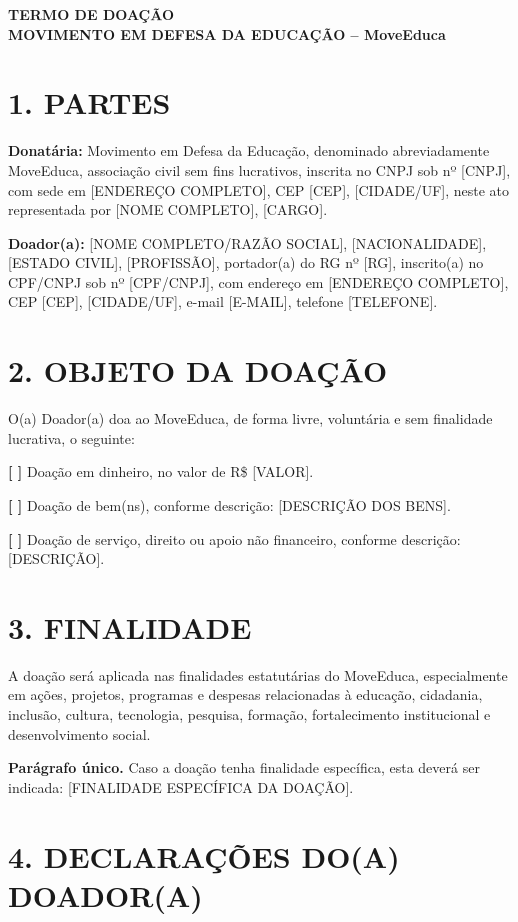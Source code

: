 \documentclass[11pt,a4paper]{article}
\begin{document}
\begin{center}
\textbf{\Large TERMO DE DOAÇÃO}\\
\textbf{\large MOVIMENTO EM DEFESA DA EDUCAÇÃO -- MoveEduca}
\end{center}

\section*{1. PARTES}

\textbf{Donatária:} Movimento em Defesa da Educação, denominado abreviadamente MoveEduca, associação civil sem fins lucrativos, inscrita no CNPJ sob nº [CNPJ], com sede em [ENDEREÇO COMPLETO], CEP [CEP], [CIDADE/UF], neste ato representada por [NOME COMPLETO], [CARGO].

\textbf{Doador(a):} [NOME COMPLETO/RAZÃO SOCIAL], [NACIONALIDADE], [ESTADO CIVIL], [PROFISSÃO], portador(a) do RG nº [RG], inscrito(a) no CPF/CNPJ sob nº [CPF/CNPJ], com endereço em [ENDEREÇO COMPLETO], CEP [CEP], [CIDADE/UF], e-mail [E-MAIL], telefone [TELEFONE].

\section*{2. OBJETO DA DOAÇÃO}

O(a) Doador(a) doa ao MoveEduca, de forma livre, voluntária e sem finalidade lucrativa, o seguinte:

\textbf{[ \quad ]} Doação em dinheiro, no valor de R\$ [VALOR].

\textbf{[ \quad ]} Doação de bem(ns), conforme descrição: [DESCRIÇÃO DOS BENS].

\textbf{[ \quad ]} Doação de serviço, direito ou apoio não financeiro, conforme descrição: [DESCRIÇÃO].

\section*{3. FINALIDADE}

A doação será aplicada nas finalidades estatutárias do MoveEduca, especialmente em ações, projetos, programas e despesas relacionadas à educação, cidadania, inclusão, cultura, tecnologia, pesquisa, formação, fortalecimento institucional e desenvolvimento social.

\textbf{Parágrafo único.} Caso a doação tenha finalidade específica, esta deverá ser indicada: [FINALIDADE ESPECÍFICA DA DOAÇÃO].

\section*{4. DECLARAÇÕES DO(A) DOADOR(A)}
\end{document}
